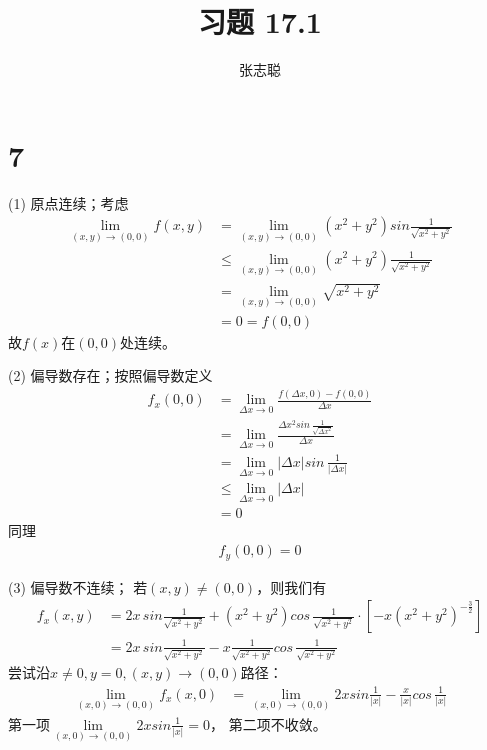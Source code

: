 \documentclass{article}
\begin{document}
\title{习题 17.1}
\author{张志聪}
\maketitle

\section*{7}

(1) 原点连续；考虑
\begin{align*}
  \lim\limits_{(x, y) \to (0, 0)} f(x, y)
   & = \lim\limits_{(x, y) \to (0, 0)} (x^2 + y^2) sin \frac{1}{\sqrt{x^2 + y^2}} \\
   & \leq \lim\limits_{(x, y) \to (0, 0)} (x^2 + y^2) \frac{1}{\sqrt{x^2 + y^2}}  \\
   & = \lim\limits_{(x, y) \to (0, 0)} \sqrt{x^2 + y^2}                           \\
   & = 0 = f(0, 0)
\end{align*}
故$f(x)$在$(0, 0)$处连续。

(2) 偏导数存在；按照偏导数定义
\begin{align*}
  f_x(0, 0) & = \lim\limits_{\Delta x \to 0} \frac{f(\Delta x, 0) - f(0, 0)}{\Delta x}                      \\
            & = \lim\limits_{\Delta x \to 0} \frac{\Delta x^2 sin \, \frac{1}{\sqrt{\Delta x^2}}}{\Delta x} \\
            & = \lim\limits_{\Delta x \to 0} |\Delta x| sin \, \frac{1}{|\Delta x|}                         \\
            & \leq \lim\limits_{\Delta x \to 0} |\Delta x|                                                  \\
            & = 0
\end{align*}
同理
\begin{align*}
  f_y(0, 0) = 0
\end{align*}

(3) 偏导数不连续；
若$(x, y) \neq (0, 0)$，则我们有
\begin{align*}
  f_x(x, y)
   & = 2x \, sin \frac{1}{\sqrt{x^2 + y^2}}
  + (x^2 + y^2) cos \, \frac{1}{\sqrt{x^2 + y^2}} \cdot [-x (x^2 + y^2)^{- \frac{3}{2}}] \\
  & = 2x \, sin \frac{1}{\sqrt{x^2 + y^2}} - x \frac{1}{\sqrt{x^2 + y^2}} cos \, \frac{1}{\sqrt{x^2 + y^2}}
\end{align*}
尝试沿$x \neq 0, y = 0, (x, y) \to (0, 0)$路径：
\begin{align*}
 \lim\limits_{(x, 0) \to (0, 0)} f_x(x, 0) 
 & = \lim\limits_{(x, 0) \to (0, 0)} 2x sin \frac{1}{|x|} - \frac{x}{|x|} cos \, \frac{1}{|x|}
\end{align*}
第一项$\lim\limits_{(x, 0) \to (0, 0)} 2x sin \frac{1}{|x|} = 0$，
第二项不收敛。
\end{document}
